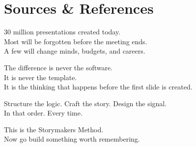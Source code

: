 \documentclass[11pt,a4paper,twoside]{article}
\begin{document}
\appendix


\section*{Sources \& References}
\theendnotes

\clearpage

\thispagestyle{empty}
\vspace*{4cm}

\begin{center}
{\fontsize{14}{18}\selectfont\color{heading}\itshape

30 million presentations created today.\\[8pt]
Most will be forgotten before the meeting ends.\\[8pt]
A few will change minds, budgets, and careers.\\[20pt]

}

{\fontsize{11}{15}\selectfont\color{textprimary}

The difference is never the software.\\[6pt]
It is never the template.\\[6pt]
It is the thinking that happens before the first slide is created.\\[12pt]

}

{\fontsize{12}{16}\selectfont\color{heading}\bfseries

Structure the logic. Craft the story. Design the signal.\\[4pt]
In that order. Every time.\\[20pt]

}

{\fontsize{11}{15}\selectfont\color{slate}
This is the Storymakers Method.\\[4pt]
Now go build something worth remembering.
}

\end{center}

\clearpage
\end{document}
